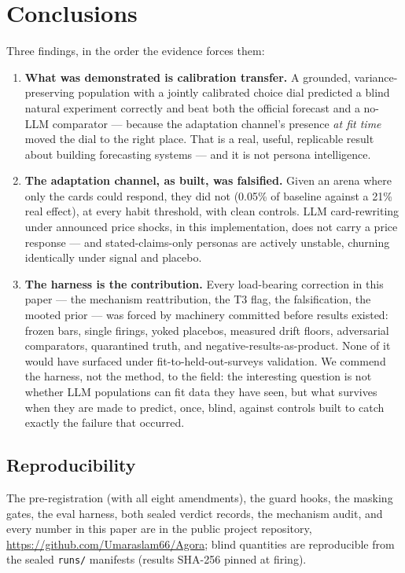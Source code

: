 \documentclass[11pt]{article}
\begin{document}
\section{Conclusions}
\label{sec:conclusions}

Three findings, in the order the evidence forces them:

\begin{enumerate}[leftmargin=1.5em,itemsep=2pt]
\item \textbf{What was demonstrated is calibration transfer.} A
grounded, variance-preserving population with a jointly calibrated
choice dial predicted a blind natural experiment correctly and beat
both the official forecast and a no-LLM comparator --- because the
adaptation channel's presence \emph{at fit time} moved the dial to the
right place. That is a real, useful, replicable result about building
forecasting systems --- and it is not persona intelligence.
\item \textbf{The adaptation channel, as built, was falsified.} Given
an arena where only the cards could respond, they did not (0.05\% of
baseline against a 21\% real effect), at every habit threshold, with
clean controls. LLM card-rewriting under announced price shocks, in
this implementation, does not carry a price response --- and
stated-claims-only personas are actively unstable, churning identically
under signal and placebo.
\item \textbf{The harness is the contribution.} Every load-bearing
correction in this paper --- the mechanism reattribution, the T3 flag,
the falsification, the mooted prior --- was forced by machinery
committed before results existed: frozen bars, single firings, yoked
placebos, measured drift floors, adversarial comparators, quarantined
truth, and negative-results-as-product. None of it would have surfaced
under fit-to-held-out-surveys validation. We commend the harness, not
the method, to the field: the interesting question is not whether LLM
populations can fit data they have seen, but what survives when they
are made to predict, once, blind, against controls built to catch
exactly the failure that occurred.
\end{enumerate}

\subsection*{Reproducibility}

The pre-registration (with all eight amendments), the guard hooks, the
masking gates, the eval harness, both sealed verdict records, the
mechanism audit, and every number in this paper are in the public
project repository, \url{https://github.com/Umaraslam66/Agora}; blind
quantities are reproducible from the sealed {\tt runs/} manifests
(results SHA-256 pinned at firing).
\end{document}
